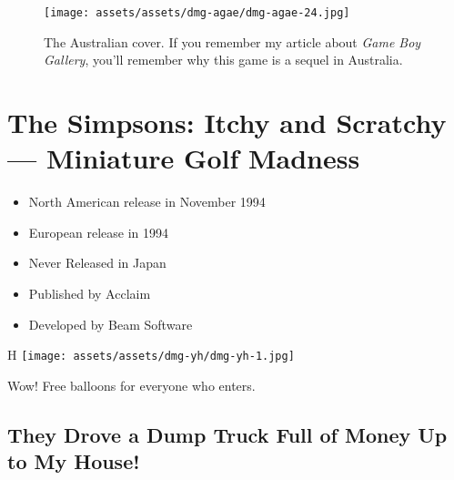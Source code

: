 \documentclass{book}
\begin{document}
\begin{figure}[hbt]
\vskip 10pt
\centering \texttt{[image: assets/assets/dmg-agae/dmg-agae-24.jpg]}\par\pagetwodescription The Australian cover. If you remember my article about \emph{Game Boy Gallery}, you’ll remember why this game is a sequel in Australia.
\vskip 6pt
\end{figure}


\begingroup \chapter*{The Simpsons: Itchy and Scratchy — Miniature Golf Madness} \endgroup

\begin{itemize} \setlength\itemsep{-0.4em}
\item North American release in November 1994
\item European release in 1994
\item Never Released in Japan
\item Published by Acclaim
\item Developed by Beam Software
\end{itemize}\noindent

\begin{wrapfigure}{H}{\linewidth}
\vskip 4pt
\centering \texttt{[image: assets/assets/dmg-yh/dmg-yh-1.jpg]}\par\pagetwodescription Wow! Free balloons for everyone who enters.\end{wrapfigure}
\clearpage

\FloatBarrier\needspace{5pt}\section*{They Drove a Dump Truck Full of Money Up to My House!}\nopagebreak[4]
\end{document}
